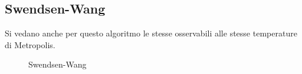\subsection*{Swendsen-Wang}
Si vedano anche per questo algoritmo le stesse osservabili alle stesse temperature di Metropolis. 
\begin{figure}[h!]
\caption{Swendsen-Wang}
\end{figure}
